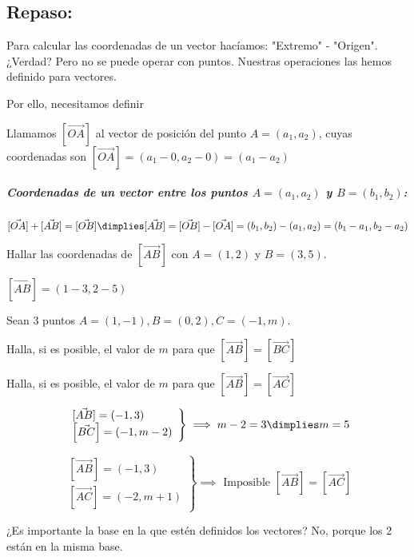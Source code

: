 \subsection{Repaso:}

Para calcular las coordenadas de un vector hacíamos: "Extremo" - "Origen". ¿Verdad?
%
Pero no se puede operar con puntos. Nuestras operaciones las hemos definido para vectores. 

Por ello, necesitamos definir

\begin{defn} Llamamos $[\vec{OA}]$ al vector de posición del punto $A=(a_1,a_2)$, cuyas coordenadas son $[\vec{OA}] = (a_1-0,a_2-0)=(a_1-a_2)$
\end{defn}


\subparagraph{Coordenadas de un vector entre los puntos $A=(a_1,a_2)$ y $B=(b_1,b_2)$:} 

$[\vec{OA}] + [\vec{AB}] =  [\vec{OB}] \dimplies [\vec{AB}] =  [\vec{OB}] - [\vec{OA}] = (b_1,b_2) - (a_1,a_2) = (b_1-a_1,b_2-a_2)$



\begin{example}
Hallar las coordenadas de $[\vec{AB}]$ con $A=(1,2)$ y $B=(3,5)$.

$[\vec{AB}] = (1-3,2-5)$
\end{example}

\begin{problem}
Sean 3 puntos $A=(1,-1), B=(0,2), C=(-1,m)$.

\ppart Halla, si es posible, el valor de $m$ para que $[\vec{AB}] = [\vec{BC}]$

\ppart Halla, si es posible, el valor de $m$ para que $[\vec{AB}] = [\vec{AC}]$

\solution

\spart 
\[
\left.\begin{array}{l}
	[\vec{AB}] = (-1,3)\\
	\left[\vec{BC}\right] = (-1,m-2)
\end{array}\right\} \implies m-2=3 \dimplies m=5
\]

\spart 
\[
\left.\begin{array}{l}
	[\vec{AB}] = (-1,3)\\
	\left[\vec{AC}\right] = (-2,m+1)
\end{array}\right\} \implies \text{ Imposible } [\vec{AB}] = [\vec{AC}]
\]

\end{problem}

\obs ¿Es importante la base en la que estén definidos los vectores? No, porque los 2 están en la misma base.

